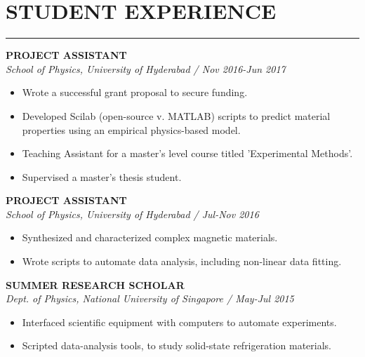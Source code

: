 \hspace{-3cm}
{\fontsize{12}{14}\selectfont
\begin{minipage}[t][\textheight-2\fboxsep-2\fboxrule][t]{.6\textwidth}
	\vspace{0.35 cm}
	
	\section*{STUDENT EXPERIENCE} \vskip -3.5mm {\color{lightgray}\hrule} \vskip 3.5mm	
	\textbf{\uppercase {Project Assistant}} \\
	\textit{School of Physics, University of Hyderabad / Nov 2016-Jun 2017}
	\begin{itemize}[noitemsep,topsep=0pt]
		\item Wrote a successful grant proposal to secure funding.
		\item Developed Scilab (open-source v. MATLAB) scripts to predict material properties using an empirical physics-based model.
		\item Teaching Assistant for a master's level course titled 'Experimental Methods'.
		\item Supervised a master's thesis student.
	\end{itemize} \vspace{0.23cm}
	
	\textbf{\uppercase {Project Assistant}} \\
	\textit{School of Physics, University of Hyderabad / {Jul-Nov 2016}}
	\begin{itemize}[noitemsep,topsep=0pt]
		\item  Synthesized and characterized complex magnetic materials.
		\item Wrote scripts to automate data analysis, including non-linear data fitting.
	\end{itemize} \vspace{0.23cm}
	
	\textbf{\uppercase {Summer Research Scholar}} \\
	\textit{Dept. of Physics, National University of Singapore / {May-Jul 2015}}
	\begin{itemize}[noitemsep,topsep=0pt]
		\item  Interfaced scientific equipment with computers to automate experiments.
		\item  Scripted data-analysis tools, to study solid-state refrigeration materials.
	\end{itemize} \vspace{0.23cm}
	

\end{minipage}}

